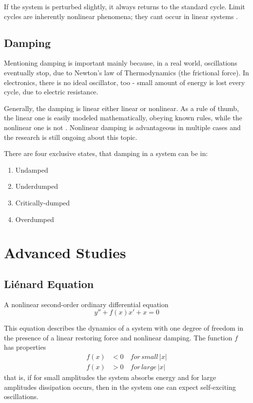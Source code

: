 \documentclass[journal]{IEEEtran}
\begin{document}
If the system is perturbed slightly, it always returns to the standard cycle. Limit cycles are inherently nonlinear phenomena; they cant occur in linear systems \cite{strogatz2008nonlinear}.


\subsection{Damping}
Mentioning damping is important mainly because, in a real world, oscillations eventually stop, due to Newton's law of Thermodynamics (the frictional force). In electronics, there is no ideal oscillator, too - small amount of energy is lost every cycle, due to electric resistance.

Generally, the damping is linear either linear or nonlinear. As a rule of thumb, the linear one is easily modeled mathematically, obeying known rules, while the nonlinear one is not \cite{institute1989estimation}. Nonlinear damping is advantageous in multiple cases and the research is still ongoing about this topic.

There are four exclusive states, that damping in a system can be in:
\begin{enumerate}
\item Undamped
\item Underdumped
\item Critically-dumped
\item Overdumped
\end{enumerate}

\section{Advanced Studies}

\subsection{Li\'{e}nard Equation}
A nonlinear second-order ordinary differential equation
\begin{equation}
\label{eq:lnrd}
y''+f(x)x'+x=0
\end{equation}

This equation describes the dynamics of a system with one degree of freedom in the presence of a linear restoring force and nonlinear damping. The function $f$ has properties
\begin{align*}
f(x)&<0\quad for\,small\,|x| \\
f(x)&>0\quad for\,large\,|x|
\end{align*}
that is, if for small amplitudes the system absorbs energy and for large amplitudes dissipation occurs, then in the system one can expect self-exciting oscillations.
\end{document}
